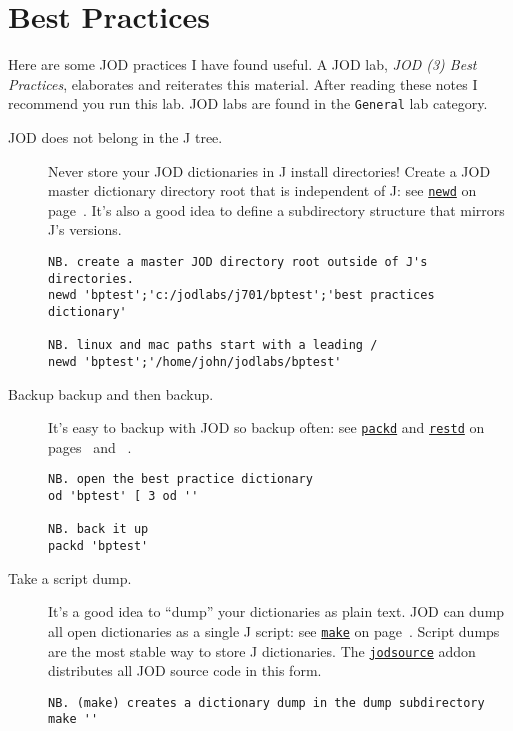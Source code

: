 \section{Best Practices}

Here are some JOD practices I have found useful.  A JOD lab, \emph{JOD (3) Best Practices}, elaborates and reiterates this material.  After reading these notes I recommend you run this lab.  JOD labs are 
found in the \texttt{General} lab category.


\begin{description}
\item[JOD does not belong in the J tree.] Never store your JOD dictionaries in J install directories!  Create a JOD master dictionary directory root that is  independent of J: see \hyperlink{il:newd}{\texttt{newd}} on page~\pageref{ss:newd}.  It's also a good idea to define a subdirectory structure that mirrors J's versions. 

\begin{lstlisting}[frame=single,framerule=0pt]
NB. create a master JOD directory root outside of J's directories.
newd 'bptest';'c:/jodlabs/j701/bptest';'best practices dictionary'

NB. linux and mac paths start with a leading /
newd 'bptest';'/home/john/jodlabs/bptest'
\end{lstlisting}

\item[Backup backup and then backup.]  It's easy to backup with JOD so backup often: see 
\hyperlink{il:packd}{\texttt{packd}} and \hyperlink{il:restd}{\texttt{restd}} on pages~\pageref{ss:packd} and ~\pageref{ss:restd}.

\begin{lstlisting}[frame=single,framerule=0pt]
NB. open the best practice dictionary
od 'bptest' [ 3 od ''

NB. back it up
packd 'bptest'
\end{lstlisting}
 

\item[Take a script dump.]  It's a good idea to ``dump'' your dictionaries as plain text.  JOD can dump all open dictionaries as a single J script: see \hyperlink{il:make}{\texttt{make}} on page~\pageref{ss:make}. Script dumps are the most stable way to store J dictionaries.  The 
\href{http://www.jsoftware.com/jwiki/Addons/general/jodsource}{\texttt{jodsource}} addon 
distributes all JOD source code in this form.

\begin{lstlisting}[frame=single,framerule=0pt]
NB. (make) creates a dictionary dump in the dump subdirectory
make ''
\end{lstlisting}
 

\end{description}
